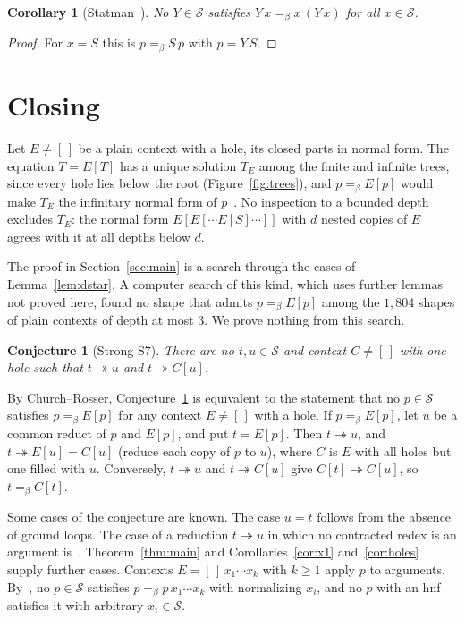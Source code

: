 \documentclass[11pt]{amsart}
\newtheorem{corollary}[theorem]{Corollary}
\newtheorem{conjecture}[theorem]{Conjecture}
\newcommand{\Ter}{\mathcal S}
\newcommand{\red}{\twoheadrightarrow}
\newcommand{\conv}{=_\beta}
\begin{document}
\begin{corollary}[{Statman~\citep[Rem.~15]{dots}}]\label{cor:fpc}
No $Y\in\Ter$ satisfies $Y\,x\conv x\,(Y\,x)$ for all $x\in\Ter$.
\end{corollary}

\begin{proof}
For $x=S$ this is $p\conv S\,p$ with $p=Y\,S$.
\end{proof}

\section{Closing}\label{sec:close}

Let $E\ne[\,]$ be a plain context with a hole, its closed parts in normal form. The equation
$T=E[T]$ has a unique solution $T_E$ among the finite and infinite trees, since every hole lies
below the root (Figure~\ref{fig:trees}), and $p\conv E[p]$ would make $T_E$ the infinitary normal
form of $p$~\citep{s3}. No inspection to a bounded depth excludes $T_E$: the normal form
$E[E[\cdots E[S]\cdots]]$ with $d$ nested copies of $E$ agrees with it at all depths below $d$.

The proof in Section~\ref{sec:main} is a search through the cases of Lemma~\ref{lem:dstar}. A
computer search of this kind, which uses further lemmas not proved here, found no shape that
admits $p\conv E[p]$ among the $1{,}804$ shapes of plain contexts of depth at most $3$. We prove
nothing from this search.

\begin{conjecture}[Strong S7]\label{conj:sg}
There are no $t,u\in\Ter$ and context $C\ne[\,]$ with one hole such that $t\red u$ and
$t\red C[u]$.
\end{conjecture}

\noindent By Church--Rosser, Conjecture~\ref{conj:sg} is equivalent to the statement that no
$p\in\Ter$ satisfies $p\conv E[p]$ for any context $E\ne[\,]$ with a hole. If $p\conv E[p]$, let
$u$ be a common reduct of $p$ and $E[p]$, and put $t=E[p]$. Then $t\red u$, and
$t\red E[u]=C[u]$ (reduce each copy of $p$ to $u$), where $C$ is $E$ with all holes but one filled
with $u$. Conversely, $t\red u$ and $t\red C[u]$ give $C[t]\red C[u]$, so $t\conv C[t]$.

Some cases of the conjecture are known. The case $u=t$ follows from the absence of ground loops.
The case of a reduction $t\red u$ in which no contracted redex is an argument
is~\citep[Thm.~5]{s7}. Theorem~\ref{thm:main} and Corollaries~\ref{cor:x1} and~\ref{cor:holes}
supply further cases. Contexts $E=[\,]\,x_1\cdots x_k$ with $k\ge1$ apply $p$ to arguments.
By~\citep{s9}, no $p\in\Ter$ satisfies $p\conv p\,x_1\cdots x_k$ with normalizing $x_i$, and no
$p$ with an hnf satisfies it with arbitrary $x_i\in\Ter$.
\end{document}
